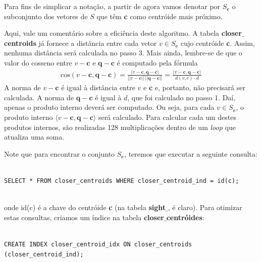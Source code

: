\documentclass[a4paper,12pt,titlepage]{scrartcl}
\begin{document}
Para fins de simplicar a notação, a partir de agora vamos denotar por $S_{\mathbf{c}}$ o subconjunto dos vetores de $S$ que têm \textbf{c} como centróide mais próximo. 

Aqui, vale um comentário sobre a eficiência deste algoritmo. A tabela \textbf{closer$\_$centroids} já fornece a distância entre cada vetor $v \in S_{\mathbf{c}}$ cujo centróide \textbf{c}. Assim, nenhuma distância será calculada no passo 3. Mais ainda, lembre-se de que o valor do cosseno entre $v-\mathbf{c}$ e $\mathbf{q}-\mathbf{c}$ é computado pela fórmula
\begin{align*} \mathrm{cos}(v-\mathbf{c},\mathbf{q}-\mathbf{c}) = \frac{\langle v-\mathbf{c},\mathbf{q}-\mathbf{c}\rangle}{||v-\mathbf{c}||\,||\mathbf{q}-\mathbf{c}||} = \frac{\langle v-\mathbf{c},\mathbf{q}-\mathbf{c}\rangle}{d(v,c)\cdot d}
\end{align*}
A norma de $v - \mathbf{c}$ é igual à distância entre $v$ e \textbf{c} e, portanto, não precisará ser calculada. A norma de $\mathbf{q} - \mathbf{c}$ é igual à $d$, que foi calculado no passo 1. Daí, apenas o produto interno deverá ser computado. Ou seja, para cada $v \in S_{\mathbf{c}}$, o produto interno $\langle v-\mathbf{c},\mathbf{q}-\mathbf{c}\rangle$ será calculado. Para calcular cada um destes produtos internos, são realizadas 128 multiplicações dentro de um \emph{loop} que atualiza uma soma. \\

\begin{remark} Note que para encontrar o conjunto $S_{\mathbf{c}}$, teremos que executar a seguinte consulta:\\

\begin{minipage}\linewidth
\begin{lstlisting}[caption = Encontrando $S_{\mathbf{c}}$, label = sc]

SELECT * FROM closer_centroids WHERE closer_centroid_ind = id(c);
   
\end{lstlisting}
\end{minipage}
\vspace{5mm}
onde id(c) é a chave do centróide \textbf{c} (na tabela \textbf{sight$\_$}, é claro). Para otimizar estas consultas, criamos um índice na tabela \textbf{closer$\_$centróides}:\\

\begin{minipage}\linewidth
\begin{lstlisting}[caption = Índice na chave do centróide mais próximo, label = indice]

CREATE INDEX closer_centroid_idx ON closer_centroids (closer_centroid_ind);

\end{lstlisting}
\end{minipage}
\vspace{5mm}
\end{remark}
\end{document}
